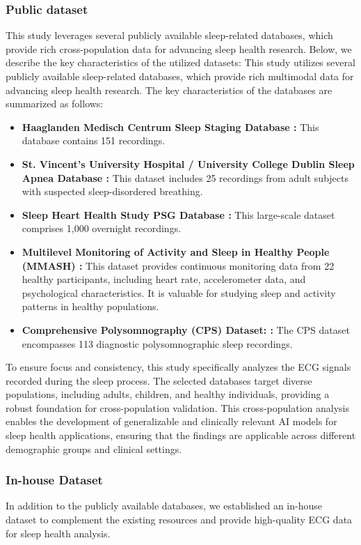 \documentclass[preprint,12pt]{elsarticle}
\begin{document}
\subsubsection{Public dataset}
This study leverages several publicly available sleep-related databases, which provide rich cross-population data for advancing sleep health research. Below, we describe the key characteristics of the utilized datasets:
This study utilizes several publicly available sleep-related databases, which provide rich multimodal data for advancing sleep health research. The key characteristics of the databases are summarized as follows:
\begin{itemize}
    \item \textbf{Haaglanden Medisch Centrum Sleep Staging Database \cite{alvarez2021haaglanden}:} This database contains 151 recordings. 
    \item \textbf{St. Vincent's University Hospital / University College Dublin Sleep Apnea Database \cite{heneghan2011st}:} This dataset includes 25 recordings from adult subjects with suspected sleep-disordered breathing.
    \item \textbf{Sleep Heart Health Study PSG Database \cite{lind2003recruitment}:} This large-scale dataset comprises 1,000 overnight recordings.
    \item \textbf{Multilevel Monitoring of Activity and Sleep in Healthy People (MMASH) \cite{rossi2020multilevel}:} This dataset provides continuous monitoring data from 22 healthy participants, including heart rate, accelerometer data, and psychological characteristics. It is valuable for studying sleep and activity patterns in healthy populations.
    \item \textbf{Comprehensive Polysomnography (CPS) Dataset: \cite{kraftcomprehensive}:} The CPS dataset encompasses 113 diagnostic polysomnographic sleep recordings.
\end{itemize}
To ensure focus and consistency, this study specifically analyzes the ECG signals recorded during the sleep process. The selected databases target diverse populations, including adults, children, and healthy individuals, providing a robust foundation for cross-population validation. This cross-population analysis enables the development of generalizable and clinically relevant AI models for sleep health applications, ensuring that the findings are applicable across different demographic groups and clinical settings.
\subsubsection{In-house Dataset}
In addition to the publicly available databases, we established an in-house dataset to complement the existing resources and provide high-quality ECG data for sleep health analysis. 
\end{document}
